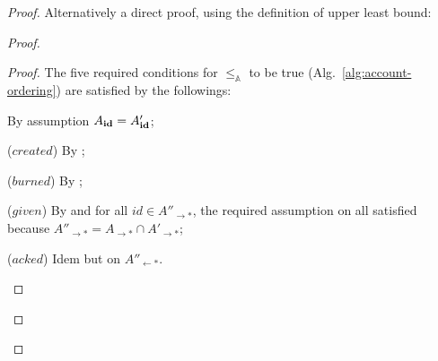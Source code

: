 \documentclass[9pt, oneside]{article}   	%
\begin{document}
\begin{proof}
Alternatively a direct proof, using the definition of upper least bound:
	\begin{proof}
				
		
		
		\qedstep
		\begin{proof}
			The five required conditions for $\leq_\mathds{A}$ to be true (Alg.~\ref{alg:account-ordering}) are satisfied by the followings:
			\begin{pfenum}
				\item By assumption $A_{\scriptsize \textbf{id}} = A'_{\scriptsize \textbf{id}}$;
				\item ($\textit{created}$) By ;
				\item ($\textit{burned}$) By ;
				\item ($\textit{given}$) By  and  for all $id \in A''_{\rightarrow *}$, the required assumption on  all satisfied because $A''_{\rightarrow *} = A_{\rightarrow *} \cap A'_{\rightarrow *}$;
				\item ($\textit{acked}$) Idem but on $A''_{\leftarrow *}$.
			\end{pfenum}
		\end{proof}
	\end{proof}
	

\end{proof}
\end{document}
